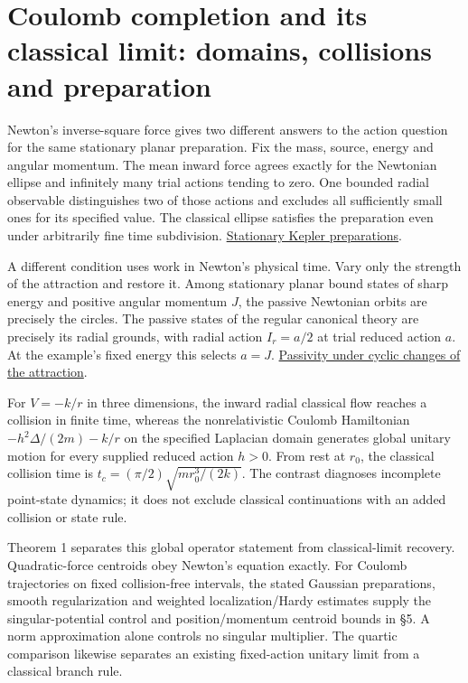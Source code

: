 \documentclass[11pt,a4paper]{article}
\begin{document}
\section{Coulomb completion and its classical limit: domains, collisions
and
preparation}\label{coulomb-completion-and-its-classical-limit-domains-collisions-and-preparation}

Newton's inverse-square force gives two different answers to the action
question for the same stationary planar preparation. Fix the mass,
source, energy and angular momentum. The mean inward force agrees
exactly for the Newtonian ellipse and infinitely many trial actions
tending to zero. One bounded radial observable distinguishes two of
those actions and excludes all sufficiently small ones for its specified
value. The classical ellipse satisfies the preparation even under
arbitrarily fine time subdivision.
\hyperref[stationary-kepler-preparations]{Stationary Kepler
preparations}.

A different condition uses work in Newton's physical time. Vary only the
strength of the attraction and restore it. Among stationary planar bound
states of sharp energy and positive angular momentum \(J\), the passive
Newtonian orbits are precisely the circles. The passive states of the
regular canonical theory are precisely its radial grounds, with radial
action \(I_r=a/2\) at trial reduced action \(a\). At the example's fixed
energy this selects \(a=J\).
\hyperref[passivity-under-cyclic-changes-of-the-attraction]{Passivity
under cyclic changes of the attraction}.

For \(V=-k/r\) in three dimensions, the inward radial classical flow
reaches a collision in finite time, whereas the nonrelativistic Coulomb
Hamiltonian \(-h^2\Delta/(2m)-k/r\) on the specified Laplacian domain
generates global unitary motion for every supplied reduced action
\(h>0\). From rest at \(r_0\), the classical collision time is
\(t_c=(\pi/2)\sqrt{mr_0^3/(2k)}\). The contrast diagnoses incomplete
point-state dynamics; it does not exclude classical continuations with
an added collision or state rule.

Theorem 1 separates this global operator statement from classical-limit
recovery. Quadratic-force centroids obey Newton's equation exactly. For
Coulomb trajectories on fixed collision-free intervals, the stated
Gaussian preparations, smooth regularization and weighted
localization/Hardy estimates supply the singular-potential control and
position/momentum centroid bounds in §5. A norm approximation alone
controls no singular multiplier. The quartic comparison likewise
separates an existing fixed-action unitary limit from a classical branch
rule.
\end{document}

